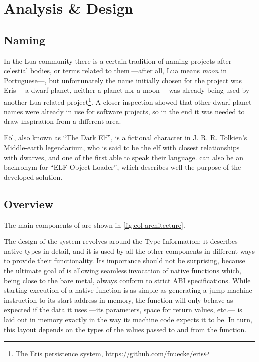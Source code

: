 \cleardoublepage

\chapter{Analysis \& Design}

\section{Naming}

In the Lua community there is a certain tradition of naming projects after
celestial bodies, or terms related to them —after all, Lua means \emph{moon}
in Portuguese—, but unfortunately the name initially chosen for the project
was Eris —a dwarf planet, neither a planet nor a moon— was already being used
by another Lua-related project\footnote{The Eris persistence system,
\url{https://github.com/fnuecke/eris}}. A closer inspection showed that other
dwarf planet names were already in use for software projects, so in the end
it was needed to draw inspiration from a different area.

Eöl, also known as “The Dark Elf”, is a fictional character in
J. R. R. Tolkien's Middle-earth legendarium, who is said to be the elf with
closest relationships with dwarves, and one of the first able to speak their
language.  \Eol* can also be an \gls{backronym} for “ELF Object Loader”,
which describes well the purpose of the developed solution.


\section{Overview}

The main components of \Eol* are shown in \autoref{fig:eol-architecture}.

The design of the system revolves around the \textsf{Type Information}: it
describes native types in detail, and it is used by all the other components
in different ways to provide their functionality. Its importance should not be
surprising, because the ultimate goal of \Eol* is allowing seamless invocation
of native functions which, being close to the bare metal, always conform to
strict \gls{ABI} specifications. While starting execution of a native function
is as simple as generating a jump machine instruction to its start address in
memory, the function will only behave as expected if the data it uses —its
parameters, space for return values, etc.— is laid out in memory exactly in
the way its machine code expects it to be. In turn, this layout depends on the
types of the values passed to and from the function.

